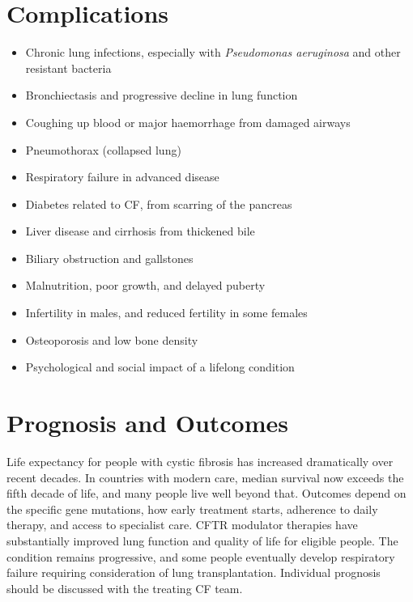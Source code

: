 \section*{Complications}
\begin{itemize}
    \item Chronic lung infections, especially with \textit{Pseudomonas aeruginosa} and other resistant bacteria
    \item Bronchiectasis and progressive decline in lung function
    \item Coughing up blood or major haemorrhage from damaged airways
    \item Pneumothorax (collapsed lung)
    \item Respiratory failure in advanced disease
    \item Diabetes related to CF, from scarring of the pancreas
    \item Liver disease and cirrhosis from thickened bile
    \item Biliary obstruction and gallstones
    \item Malnutrition, poor growth, and delayed puberty
    \item Infertility in males, and reduced fertility in some females
    \item Osteoporosis and low bone density
    \item Psychological and social impact of a lifelong condition
\end{itemize}

\section*{Prognosis and Outcomes}
Life expectancy for people with cystic fibrosis has increased dramatically over recent decades. In countries with modern care, median survival now exceeds the fifth decade of life, and many people live well beyond that. Outcomes depend on the specific gene mutations, how early treatment starts, adherence to daily therapy, and access to specialist care. CFTR modulator therapies have substantially improved lung function and quality of life for eligible people. The condition remains progressive, and some people eventually develop respiratory failure requiring consideration of lung transplantation. Individual prognosis should be discussed with the treating CF team.

